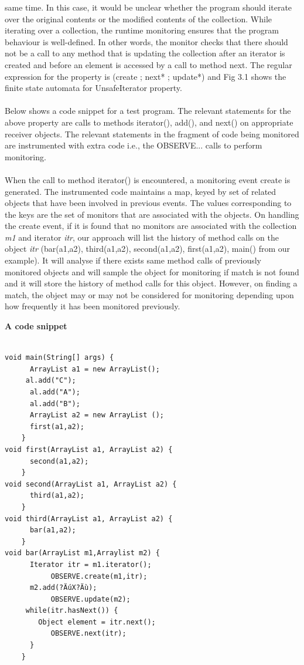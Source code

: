 {same time. In this case, it would be unclear whether the program should iterate 
over the original contents or the modified contents of the collection. While 
iterating over a collection, the runtime monitoring ensures that the program 
behaviour is well-defined. In other words, the monitor checks that there should 
not be a call to any method that is updating the collection after an iterator is 
created and before an element is accessed by a call to method next. The regular 
expression for the property is (create ; next* ; update*) and Fig 3.1 shows the 
finite state automata for UnsafeIterator property.\\\\
Below shows a code snippet for a test program. The relevant statements for the 
above property are calls to methods iterator(), add(), and next() on appropriate 
receiver objects. The relevant statements in the fragment of code being 
monitored are instrumented with extra code i.e., the OBSERVE... calls to perform 
monitoring.\\\\
When the call to method iterator() is encountered, a monitoring event create is 
generated. The instrumented code maintains a map, keyed by set of related 
objects that have been involved in previous events. The values corresponding to 
the keys are the set of monitors that are associated with the objects. On 
handling the create event, if it is found that no monitors are associated with 
the collection \textit{m1} and iterator \textit{itr}, our approach will list the 
history of method calls on the object \textit{itr} (bar(a1,a2), third(a1,a2), 
second(a1,a2), first(a1,a2), main() from our example). It will analyse if there 
exists same method calls of previously monitored objects and will sample the 
object for monitoring if match is not found and it will store the history of 
method calls for this object. However, on finding a match, the object may or may 
not be considered for monitoring depending upon how frequently it has been 
monitored previously.
\begin{center}
\textbf{A code snippet}
\begin{lstlisting}

void main(String[] args) {
	  ArrayList a1 = new ArrayList();
     al.add("C");
	  al.add("A");
	  al.add("B"); 
	  ArrayList a2 = new ArrayList ();
	  first(a1,a2);
	}
void first(ArrayList a1, ArrayList a2) { 
	  second(a1,a2); 
	} 
void second(ArrayList a1, ArrayList a2) {
	  third(a1,a2); 
	} 
void third(ArrayList a1, ArrayList a2) {
	  bar(a1,a2); 
	}
void bar(ArrayList m1,Arraylist m2) {
	  Iterator itr = m1.iterator();
		   OBSERVE.create(m1,itr);
	  m2.add(?ÄúX?Äù);
		   OBSERVE.update(m2);
     while(itr.hasNext()) {
	    Object element = itr.next();
		   OBSERVE.next(itr);
	  }
	}
    

\end{lstlisting}
\end{center}}
